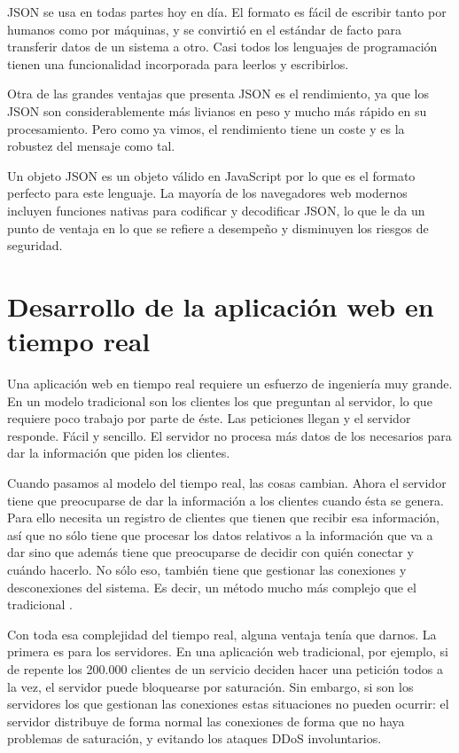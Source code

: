 JSON se usa en todas partes hoy en día. El formato es fácil de escribir tanto por humanos como por máquinas, y se convirtió en el estándar de facto para transferir datos de un sistema a otro. Casi todos los lenguajes de programación tienen una funcionalidad incorporada para leerlos y escribirlos.

Otra de las grandes ventajas que presenta JSON es el rendimiento, ya que los JSON son considerablemente más livianos en peso y mucho más rápido en su procesamiento. Pero como ya vimos, el rendimiento tiene un coste y es la robustez del mensaje como tal.

Un objeto JSON es un objeto válido en JavaScript por lo que es el formato perfecto para este lenguaje. La mayoría de los navegadores web modernos incluyen funciones nativas para codificar y decodificar JSON, lo que le da un punto de ventaja en lo que se refiere a desempeño y disminuyen los riesgos de seguridad.

\section{Desarrollo de la aplicación web en tiempo real}

Una aplicación web en tiempo real requiere un esfuerzo de ingeniería muy grande. En un modelo tradicional son los clientes los que preguntan al servidor, lo que requiere poco trabajo por parte de éste. Las peticiones llegan y el servidor responde. Fácil y sencillo. El servidor no procesa más datos de los necesarios para dar la información que piden los clientes.

Cuando pasamos al modelo del tiempo real, las cosas cambian. Ahora el servidor tiene que preocuparse de dar la información a los clientes cuando ésta se genera. Para ello necesita un registro de clientes que tienen que recibir esa información, así que no sólo tiene que procesar los datos relativos a la información que va a dar sino que además tiene que preocuparse de decidir con quién conectar y cuándo hacerlo. No sólo eso, también tiene que gestionar las conexiones y desconexiones del sistema. Es decir, un método mucho más complejo que el tradicional \cite{app9}.

Con toda esa complejidad del tiempo real, alguna ventaja tenía que darnos. La primera es para los servidores. En una aplicación web tradicional, por ejemplo, si de repente los 200.000 clientes de un servicio deciden hacer una petición todos a la vez, el servidor puede bloquearse por saturación. Sin embargo, si son los servidores los que gestionan las conexiones estas situaciones no pueden ocurrir: el servidor distribuye de forma normal las conexiones de forma que no haya problemas de saturación, y evitando los ataques DDoS involuntarios.

